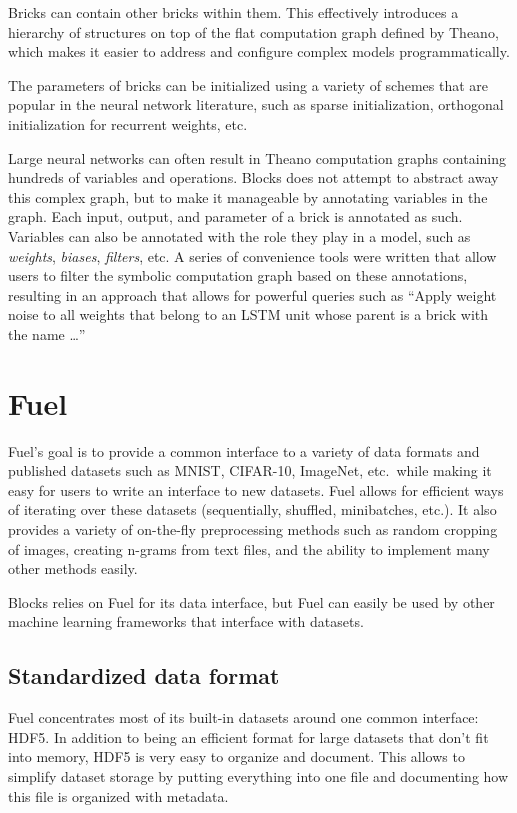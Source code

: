 \documentclass[twoside,11pt]{article}
\begin{document}
Bricks can contain other bricks within them. This effectively introduces a
hierarchy of structures on top of the flat computation graph defined by Theano,
which makes it easier to address and configure complex models programmatically.

The parameters of bricks can be initialized using a variety of schemes that are
popular in the neural network literature, such as sparse initialization,
orthogonal initialization for recurrent weights, etc.

Large neural networks can often result in Theano computation graphs containing
hundreds of variables and operations. Blocks does not attempt to abstract away
this complex graph, but to make it manageable by annotating variables in the
graph. Each input, output, and parameter of a brick is annotated as such.
Variables can also be annotated with the role they play in a model, such as
\emph{weights}, \emph{biases}, \emph{filters}, etc. A series of convenience
tools were written that allow users to filter the symbolic computation graph
based on these annotations, resulting in an approach that allows for powerful
queries such as ``Apply weight noise to all weights that belong to an LSTM
unit whose parent is a brick with the name \ldots''

\section{Fuel}

Fuel's goal is to provide a common interface to a variety of data formats and
published datasets such as MNIST, CIFAR-10, ImageNet, etc.\ while making it easy
for users to write an interface to new datasets. Fuel allows for efficient ways
of iterating over these datasets (sequentially, shuffled, minibatches, etc.).
It also provides a variety of on-the-fly preprocessing methods such as random
cropping of images, creating n-grams from text files, and the ability to
implement many other methods easily.

Blocks relies on Fuel for its data interface, but Fuel can easily be used by
other machine learning frameworks that interface with datasets.

\subsection{Standardized data format}

Fuel concentrates most of its built-in datasets around one common interface:
HDF5. In addition to being an efficient format for large datasets that don't
fit into memory, HDF5 is very easy to organize and document. This allows to
simplify dataset storage by putting everything into one file and documenting
how this file is organized with metadata.
\end{document}
